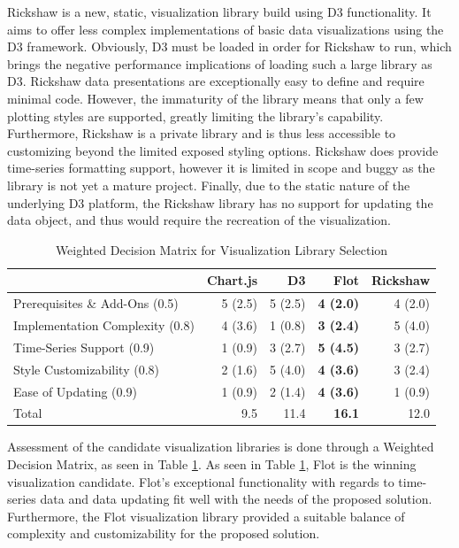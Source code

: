\documentclass{report}
\begin{document}
Rickshaw is a new, static, visualization library build using D3 functionality. It aims to offer less complex implementations of basic data visualizations using the D3 framework. Obviously, D3 must be loaded in order for Rickshaw to run, which brings the negative performance implications of loading such a large library as D3. Rickshaw data presentations are exceptionally easy to define and require minimal code. However, the immaturity of the library means that only a few plotting styles are supported, greatly limiting the library's capability. Furthermore, Rickshaw is a private library and is thus less accessible to customizing beyond the limited exposed styling options. Rickshaw does provide time-series formatting support, however it is limited in scope and buggy as the library is not yet a mature project. Finally, due to the static nature of the underlying D3 platform, the Rickshaw library has no support for updating the data object, and thus would require the recreation of the visualization.

\begin{table}
\centering
    \begin{tabular}{l | r r r r}
    ~                               & Chart.js & D3      & \textbf{Flot}    & Rickshaw \\ \hline
    Prerequisites \& Add-Ons (0.5)  & 5 (2.5)  & 5 (2.5) & \textbf{4 (2.0)} & 4 (2.0)  \\
    Implementation Complexity (0.8) & 4 (3.6)  & 1 (0.8) & \textbf{3 (2.4)} & 5 (4.0)  \\
    Time-Series Support (0.9)       & 1 (0.9)  & 3 (2.7) & \textbf{5 (4.5)} & 3 (2.7)  \\
    Style Customizability (0.8)     & 2 (1.6)  & 5 (4.0) & \textbf{4 (3.6)} & 3 (2.4)  \\
    Ease of Updating (0.9)          & 1 (0.9)  & 2 (1.4) & \textbf{4 (3.6)} & 1 (0.9)  \\ \hline
    Total                           & 9.5      & 11.4    & \textbf{16.1}    & 12.0     \\
    \end{tabular}
\caption{Weighted Decision Matrix for Visualization Library Selection}
\label{table:visualization-matrix}
\end{table}

Assessment of the candidate visualization libraries is done through a Weighted Decision Matrix, as seen in Table \ref{table:visualization-matrix}. As seen in Table \ref{table:visualization-matrix}, Flot is the winning visualization candidate. Flot's exceptional functionality with regards to time-series data and data updating fit well with the needs of the proposed solution. Furthermore, the Flot visualization library provided a suitable balance of complexity and customizability for the proposed solution.
\end{document}
